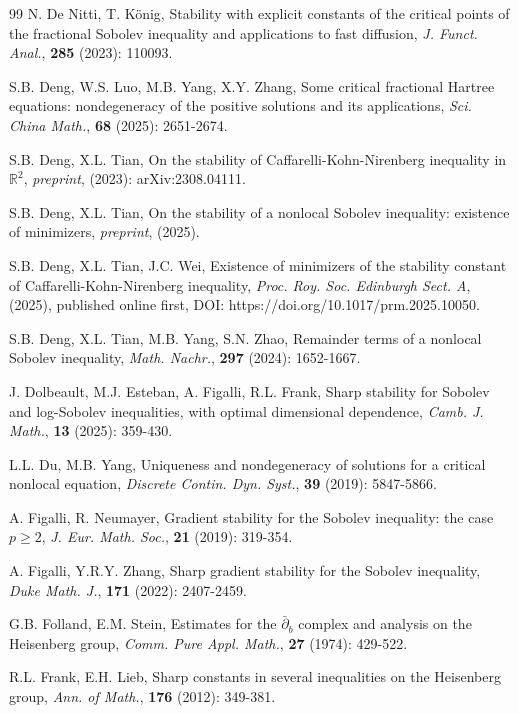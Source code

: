 \documentclass[11pt]{article}
\begin{document}
\begin{thebibliography}{99}
N. De Nitti, T. K\"{o}nig,
Stability with explicit constants of the critical points of the fractional Sobolev inequality and applications to fast diffusion,
{\em J. Funct. Anal.}, {\bf 285} (2023): 110093.



 S.B. Deng, W.S. Luo, M.B. Yang, {X.Y. Zhang},
Some critical fractional Hartree equations: nondegeneracy of the positive solutions and its applications, {\em Sci. China Math.}, {\bf 68} (2025): 2651-2674.

 S.B. Deng, X.L. Tian,
On the stability of Caffarelli-Kohn-Nirenberg inequality in $\mathbb{R}^2$,
{\em preprint}, (2023): arXiv:2308.04111.


 S.B. Deng, X.L. Tian,
On the stability of a nonlocal Sobolev inequality: existence of minimizers,
{\em preprint}, (2025).

 S.B. Deng, X.L. Tian, J.C. Wei,
Existence of minimizers of the stability constant of Caffarelli-Kohn-Nirenberg inequality,
{\em Proc. Roy. Soc. Edinburgh Sect. A}, (2025), published online first,
DOI: https://doi.org/10.1017/prm.2025.10050.


 S.B. Deng, X.L. Tian, M.B. Yang, S.N. Zhao,
Remainder terms of a nonlocal Sobolev inequality,
{\em Math. Nachr.}, {\bf 297} (2024): 1652-1667.



J. Dolbeault, M.J. Esteban, A. Figalli, R.L. Frank,
Sharp stability for Sobolev and log-Sobolev inequalities, with optimal dimensional dependence,
{\em Camb. J. Math.}, {\bf 13} (2025): 359-430.


 L.L. Du, M.B. Yang,
Uniqueness and nondegeneracy of solutions for a critical nonlocal equation,
{\em Discrete Contin. Dyn. Syst.}, {\bf 39} (2019): 5847-5866.

 A. Figalli, R. Neumayer,
Gradient stability for the Sobolev inequality: the case $p\geq2$, {\em J. Eur. Math. Soc.},
{\bf 21} (2019): 319-354.

 A. Figalli, Y.R.Y. Zhang,
Sharp gradient stability for the Sobolev inequality,
{\em Duke Math. J.}, {\bf 171} (2022): 2407-2459.

 G.B. Folland, E.M. Stein,
Estimates for the $\bar{\partial}_b$ complex and analysis on the Heisenberg group,
{\em Comm. Pure Appl. Math.}, {\bf 27}
(1974): 429-522.

 R.L. Frank, E.H. Lieb,
Sharp constants in several inequalities on the Heisenberg group,
{\em Ann. of Math.}, {\bf 176} (2012): 349-381.


\end{thebibliography}
\end{document}

